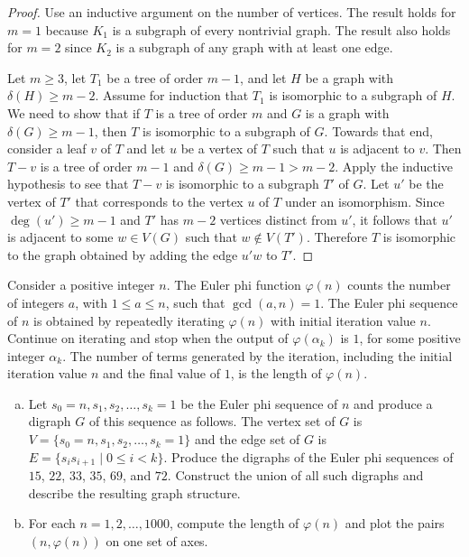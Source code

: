 \begin{proof}
Use an inductive argument on the number of
vertices. The result holds for $m = 1$ because
$K_1$ is a subgraph of every nontrivial graph. The
result also holds for $m = 2$ since $K_2$ is a subgraph of any graph
with at least one edge.

Let $m \geq 3$, let $T_1$ be a tree of order $m - 1$, and let $H$ be a
graph with $\delta(H) \geq m - 2$. Assume for induction that $T_1$ is
isomorphic to a subgraph of $H$. We need to show that if $T$ is a tree
of order $m$ and $G$ is a graph with $\delta(G) \geq m - 1$, then $T$
is isomorphic to a subgraph of $G$. Towards that end, consider a leaf
$v$ of $T$ and let $u$ be a vertex of $T$ such that $u$ is adjacent to
$v$. Then $T - v$ is a tree of order $m - 1$ and
$\delta(G) \geq m - 1 > m - 2$. Apply the inductive hypothesis to see
that $T - v$ is isomorphic to a subgraph $T'$ of $G$. Let $u'$ be the
vertex of $T'$ that corresponds to the vertex $u$ of $T$ under an
isomorphism. Since $\deg(u') \geq m - 1$ and $T'$
has $m - 2$ vertices distinct from $u'$, it follows that $u'$ is
adjacent to some $w \in V(G)$ such that $w \notin V(T')$. Therefore
$T$ is isomorphic to the graph obtained by adding the edge $u'w$ to
$T'$.
\end{proof}

\begin{example}
\label{eg:trees_forests:Euler_phi_function_tree}
Consider a positive integer $n$. The Euler
phi function
$\varphi(n)$ counts the number of integers $a$,
with $1 \leq a \leq n$, such that $\gcd(a,n) = 1$. The Euler phi
sequence of $n$ is obtained by repeatedly
iterating $\varphi(n)$ with initial iteration value $n$. Continue on
iterating and stop when the output of $\varphi(\alpha_k)$ is $1$, for
some positive integer $\alpha_k$. The number of terms generated by the
iteration, including the initial iteration value $n$ and the final
value of $1$, is the length of $\varphi(n)$.
\begin{enumerate}[(a)]
\item Let $s_0=n, s_1, s_2, \dots, s_k=1$ be the Euler phi
  sequence of $n$ and produce a digraph $G$
  of this sequence as follows. The vertex set of $G$ is
  $V = \{s_0=n, s_1, s_2, \dots, s_k=1\}$ and the edge set of $G$ is
  $E = \{s_i s_{i+1} \mid 0 \leq i < k\}$. Produce the digraphs of the
  Euler phi sequences of $15$, $22$, $33$,
  $35$, $69$, and $72$. Construct the union of
  all such digraphs and describe the resulting graph structure.

\item For each $n = 1, 2, \dots, 1000$, compute the length of
  $\varphi(n)$ and plot the pairs $(n, \varphi(n))$ on one set of axes.
\end{enumerate}
\end{example}

